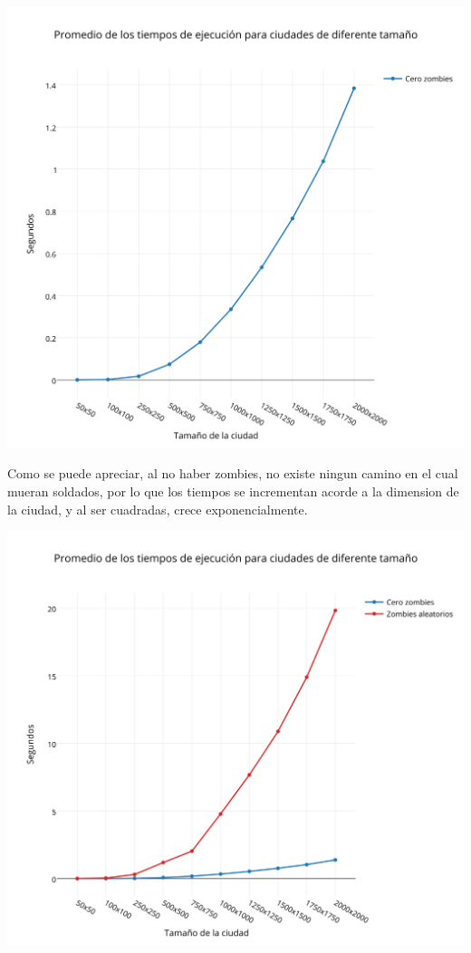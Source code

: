 \includegraphics[width=15cm,keepaspectratio=yes]{imagenes/ej2/czneto.png}

Como se puede apreciar, al no haber zombies, no existe ningun camino en el cual mueran soldados, por lo que los tiempos se incrementan acorde a la dimension de la ciudad, y al ser cuadradas, crece exponencialmente.

\includegraphics[width=15cm,keepaspectratio=yes]{imagenes/ej2/czyza.png}

